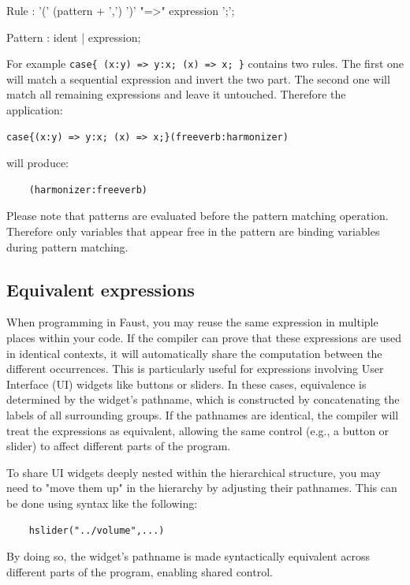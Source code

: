 \begin{rail}
Rule : '(' (pattern + ',') ')' "=>" expression ';';
\end{rail}

\begin{rail}
Pattern : ident | expression;
\end{rail}


For example \lstinline'case{ (x:y) => y:x; (x) => x; }' contains two rules. The first one will match a sequential expression and invert the two part. The second one will match all remaining expressions and leave it untouched. Therefore the application:

\begin{lstlisting}
case{(x:y) => y:x; (x) => x;}(freeverb:harmonizer)
\end{lstlisting}

will produce:

\begin{lstlisting}
	(harmonizer:freeverb)
\end{lstlisting}

Please note that patterns are evaluated before the pattern matching operation. Therefore only variables that appear free in the pattern are binding variables during pattern matching. 

\subsection{Equivalent expressions}

When programming in Faust, you may reuse the same expression in multiple places within your code. If the compiler can prove that these expressions are used in identical contexts, it will automatically share the computation between the different occurrences. This is particularly useful for expressions involving User Interface (UI) widgets like buttons or sliders. In these cases, equivalence is determined by the widget’s pathname, which is constructed by concatenating the labels of all surrounding groups. If the pathnames are identical, the compiler will treat the expressions as equivalent, allowing the same control (e.g., a button or slider) to affect different parts of the program.

To share UI widgets deeply nested within the hierarchical structure, you may need to "move them up" in the hierarchy by adjusting their pathnames. This can be done using syntax like the following:

\begin{lstlisting}
	hslider("../volume",...)
\end{lstlisting}

By doing so, the widget's pathname is made syntactically equivalent across different parts of the program, enabling shared control.
